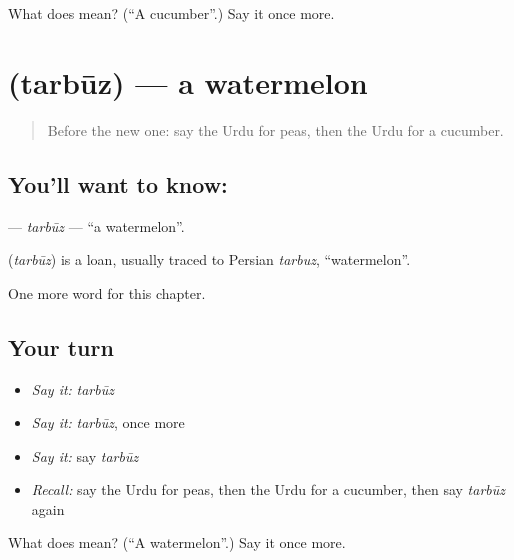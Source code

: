\begin{tcolorbox}[breakable,colback=teal!4,colframe=teal!35!black,title={Before you move on}]
What does  mean? (\textquotedblleft{}A cucumber\textquotedblright{}.) Say it once more.
\end{tcolorbox}
\section[\texorpdfstring{\ur{تربوز} (tarbūz)}{تربوز (tarbūz)}]{ (tarbūz) — a watermelon}

\label{lesson:UR-C115-tarbuz}



\begin{quote}
Before the new one: say the Urdu for peas, then the Urdu for a cucumber.
\end{quote}

\subsection*{You'll want to know: }
\textbf{} — \emph{tarbūz} — \textquotedblleft{}a watermelon\textquotedblright{}.

\begin{cousinweb}
\textbf{} (\emph{tarbūz}) is a loan, usually traced to Persian \emph{tarbuz}, \textquotedblleft{}watermelon\textquotedblright{}.
\end{cousinweb}

\begin{grammarlens}[title={What you've built}]
One more word for this chapter.
\end{grammarlens}

\subsection*{Your turn}
\begin{itemize}
\raggedright
  \item \emph{Say it:} \emph{tarbūz}
  \item \emph{Say it:} \emph{tarbūz}, once more
  \item \emph{Say it:} say \emph{tarbūz}
  \item \emph{Recall:} say the Urdu for peas, then the Urdu for a cucumber, then say \emph{tarbūz} again
\end{itemize}

\begin{tcolorbox}[breakable,colback=teal!4,colframe=teal!35!black,title={Before you move on}]
What does  mean? (\textquotedblleft{}A watermelon\textquotedblright{}.) Say it once more.
\end{tcolorbox}
